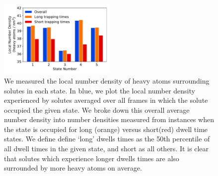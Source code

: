 \documentclass{article}
\begin{document}
  \begin{figure}
  \centering
  \includegraphics[width=0.5\textwidth]{local_densities.pdf}
  \caption{We measured the local number density of heavy atoms surrounding solutes in each
  state. In blue, we plot the local number density experienced by solutes averaged over all
  frames in which the solute occupied the given state. We broke down this overall average 
  number density into number densities measured from instances when the state is occupied 
  for long (orange) versus short(red) dwell time states. We define define `long' dwells times
  as the 50th percentile of all dwell times in the given state, and short as all others. It
  is clear that solutes which experience longer dwells times are also surrounded by more 
  heavy atoms on average.}\label{fig:local_densities}
  \end{figure}
  
\end{document}
